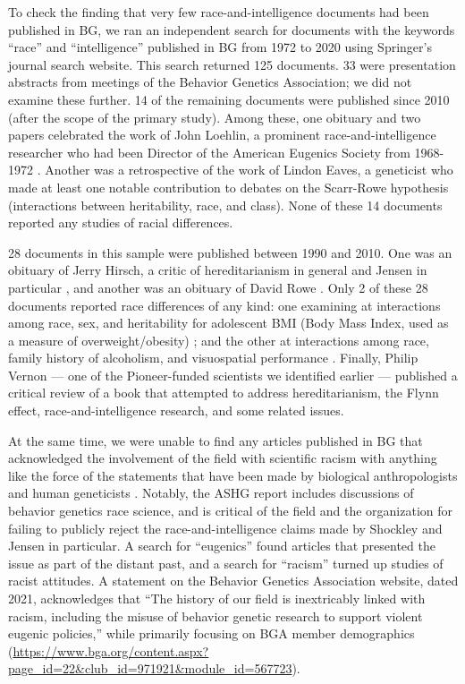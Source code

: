 \documentclass[12pt]{article}
\begin{document}
To check the finding that very few race-and-intelligence documents had been published in BG, we ran an independent search for documents with the keywords ``race'' and ``intelligence'' published in BG from 1972 to 2020 using Springer's journal search website. This search returned 125 documents. 33 were presentation abstracts from meetings of the Behavior Genetics Association; we did not examine these further. 14 of the remaining documents were published since 2010 (after the scope of the primary study). Among these, one obituary and two papers celebrated the work of John Loehlin, a prominent race-and-intelligence researcher who had been Director of the American Eugenics Society from 1968-1972 \cite{JohnLoehlin19262020, WaldmanIntroductionFestschriftJohn2014, PlominGenotypeEnvironmentCorrelationEra2014}. Another was a retrospective of the work of Lindon Eaves, a geneticist who made at least one notable contribution to debates on the Scarr-Rowe hypothesis (interactions between heritability, race, and class). None of these 14 documents reported any studies of racial differences.

28 documents in this sample were published between 1990 and 2010. One was an obituary of Jerry Hirsch, a critic of hereditarianism in general and Jensen in particular \cite{RoubertouxJerryHirsch202008}, and another was an obituary of David Rowe \cite{RodgersObituaryDavidChristian2003}. Only 2 of these 28 documents reported race differences of any kind: one examining at interactions among race, sex, and heritability for adolescent BMI (Body Mass Index, used as a measure of overweight/obesity) \cite{JacobsonGeneticSharedEnvironmental1998}; and the other at interactions among race, family history of alcoholism, and visuospatial performance \cite{BermanReducedVisuospatialPerformance1995}. Finally, Philip Vernon --- one of the Pioneer-funded scientists we identified earlier --- published a critical review of a book that attempted to address hereditarianism, the Flynn effect, race-and-intelligence research, and some related issues.

At the same time, we were unable to find any articles published in BG that acknowledged the involvement of the field with scientific racism with anything like the force of the statements that have been made by biological anthropologists \cite{FuentesAAPAStatementRace2019} and human geneticists \cite{JacksonFacingOurHistory2023}. Notably, the ASHG report includes discussions of behavior genetics race science, and is critical of the field and the organization for failing to publicly reject the race-and-intelligence claims made by Shockley and Jensen in particular. A search for ``eugenics'' found articles that presented the issue as part of the distant past, and a search for ``racism'' turned up studies of racist attitudes. A statement on the Behavior Genetics Association website, dated 2021, acknowledges that ``The history of our field is inextricably linked with racism, including the misuse of behavior genetic research to support violent eugenic policies,'' while primarily focusing on BGA member demographics (\url{https://www.bga.org/content.aspx?page_id=22\&club_id=971921\&module_id=567723}).
\end{document}
